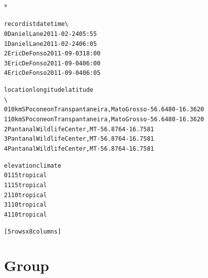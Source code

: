 \documentclass[letterpaper,10pt,english]{/usr/share/sphinx/texinputs/sphinxhowto}
\def\smaller{\fontsize{9.5pt}{9.5pt}\selectfont}
\newenvironment{InvisibleVerbatim}
        {\begin{mdframed}[leftmargin=0.1\linewidth,innerleftmargin=3pt,innerrightmargin=3pt, userdefinedwidth=1\linewidth, linewidth=0pt, linecolor=white, usetwoside=false]}
        {\end{mdframed}}
\begin{document}
    

        
        

            
                \makebox[0.1\linewidth]{\smaller\hfill\tt\color{nbframe-out-prompt}Out\hspace{4pt}{[}39{]}:\hspace{4pt}}\\*
                \vspace{-2.55\baselineskip}\begin{InvisibleVerbatim}
                \vspace{-0.5\baselineskip}
\begin{alltt}      recordist        date   time  \textbackslash{}
0   Daniel Lane  2011-02-24  05:55
1   Daniel Lane  2011-02-24  06:05
2  Eric DeFonso  2011-09-03  18:00
3  Eric DeFonso  2011-09-04  06:00
4  Eric DeFonso  2011-09-04  06:05

                                         location  longitude  latitude
\textbackslash{}
0  10 km S Pocone on Transpantaneira, Mato Grosso   -56.6480  -16.3620
1  10 km S Pocone on Transpantaneira, Mato Grosso   -56.6480  -16.3620
2                    Pantanal Wildlife Center, MT   -56.8764  -16.7581
3                    Pantanal Wildlife Center, MT   -56.8764  -16.7581
4                    Pantanal Wildlife Center, MT   -56.8764  -16.7581

  elevation   climate
0       115  tropical
1       115  tropical
2       110  tropical
3       110  tropical
4       110  tropical

[5 rows x 8 columns]\end{alltt}

            \end{InvisibleVerbatim}
            
        
    
\section{Group}

\end{document}
